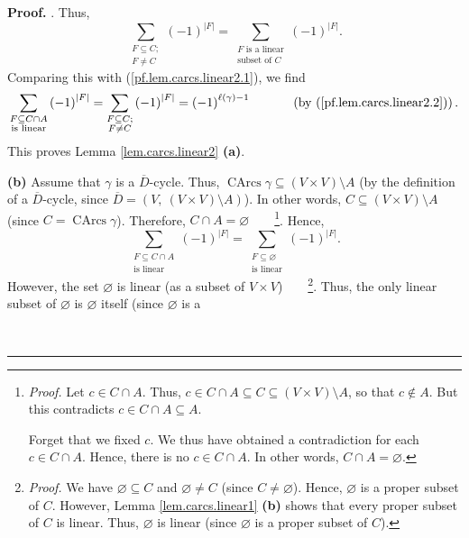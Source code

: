 \documentclass[numbers=enddot,12pt,final,onecolumn,notitlepage]{scrartcl}%
\numberwithin{exer}{section}
\theoremstyle{definition}
\newenvironment{proof}[1][Proof]{\noindent\textbf{#1.} }{\ \rule{0.5em}{0.5em}}
\let\sumnonlimits\sum
\renewcommand{\sum}{\sumnonlimits\limits}
\newenvironment{verlong}{}{}
\begin{document}
\begin{verlong}
\begin{proof}
. Thus,
\[
\sum_{\substack{F\subseteq C;\\F\neq C}}\left(  -1\right)  ^{\left\vert
F\right\vert }=\sum_{\substack{F\text{ is a linear}\\\text{subset of }%
C}}\left(  -1\right)  ^{\left\vert F\right\vert }.
\]
Comparing this with (\ref{pf.lem.carcs.linear2.1}), we find%
\[
\sum_{\substack{F\subseteq C\cap A\\\text{is linear}}}\left(  -1\right)
^{\left\vert F\right\vert }=\sum_{\substack{F\subseteq C;\\F\neq C}}\left(
-1\right)  ^{\left\vert F\right\vert }=\left(  -1\right)  ^{\ell\left(
\gamma\right)  -1}\ \ \ \ \ \ \ \ \ \ \left(  \text{by
(\ref{pf.lem.carcs.linear2.2})}\right)  .
\]
This proves Lemma \ref{lem.carcs.linear2} \textbf{(a)}. \medskip

\textbf{(b)} Assume that $\gamma$ is a $\overline{D}$-cycle. Thus,
$\operatorname*{CArcs}\gamma\subseteq\left(  V\times V\right)  \setminus A$
(by the definition of a $\overline{D}$-cycle, since $\overline{D}=\left(
V,\ \left(  V\times V\right)  \setminus A\right)  $). In other words,
$C\subseteq\left(  V\times V\right)  \setminus A$ (since
$C=\operatorname*{CArcs}\gamma$). Therefore, $C\cap A=\varnothing
$\ \ \ \ \footnote{\textit{Proof.} Let $c\in C\cap A$. Thus, $c\in C\cap
A\subseteq C\subseteq\left(  V\times V\right)  \setminus A$, so that $c\notin
A$. But this contradicts $c\in C\cap A\subseteq A$.
\par
Forget that we fixed $c$. We thus have obtained a contradiction for each $c\in
C\cap A$. Hence, there is no $c\in C\cap A$. In other words, $C\cap
A=\varnothing$.}. Hence,%
\begin{equation}
\sum_{\substack{F\subseteq C\cap A\\\text{is linear}}}\left(  -1\right)
^{\left\vert F\right\vert }=\sum_{\substack{F\subseteq\varnothing\\\text{is
linear}}}\left(  -1\right)  ^{\left\vert F\right\vert }.
\label{pf.lem.carcs.linear2.4}%
\end{equation}
However, the set $\varnothing$ is linear (as a subset of $V\times
V$)\ \ \ \ \footnote{\textit{Proof.} We have $\varnothing\subseteq C$ and
$\varnothing\neq C$ (since $C\neq\varnothing$). Hence, $\varnothing$ is a
proper subset of $C$. However, Lemma \ref{lem.carcs.linear1} \textbf{(b)}
shows that every proper subset of $C$ is linear. Thus, $\varnothing$ is linear
(since $\varnothing$ is a proper subset of $C$).}. Thus, the only linear
subset of $\varnothing$ is $\varnothing$ itself (since $\varnothing$ is a

\end{proof}
\end{verlong}
\end{document}
